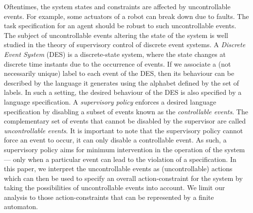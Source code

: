 \documentclass[letterpaper, 10 pt, conference]{ieeeconf}
\begin{document}

Oftentimes, the system states and constraints are affected by uncontrollable events. For example, some actuators of a robot can break down due to faults. The task specification for an agent should be robust to such uncontrollable events. The subject of uncontrollable events altering the state of the system is well studied in the theory of supervisory control of discrete event systems\cite{ramadge1989control, cassandras2009introduction}. A {\em Discrete Event System} (DES) is a discrete-state system, where the state changes at discrete time instants due to the occurrence of events. If we associate a (not necessarily unique) label to each event of the DES, then its behaviour can be described by the language it generates using the alphabet defined by the set of labels. In such a setting, the desired behaviour of the DES is also specified by a language specification. A \textit{supervisory policy} enforces a desired language specification by disabling a subset of events known as the \textit{controllable events}. The complementary set of events that cannot be disabled by the supervisor are called \textit{uncontrollable events}. It is important to note that the supervisory policy cannot force an event to occur, it can only disable a controllable event. As such, a supervisory policy aims for minimum intervention in the operation of the system--- only when a particular event can lead to the violation of a specification. In this paper, we interpret the uncontrollable events as (uncontrollable) actions which can then be used to specify an overall action-constraint for the system by taking the possibilities of uncontrollable events into account. We limit our analysis to those action-constraints that can be represented by a finite automaton.
\end{document}
